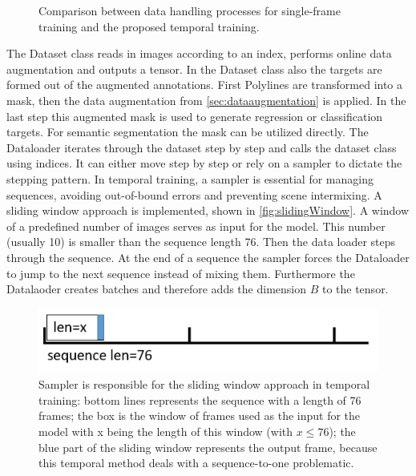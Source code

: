 \begin{figure}[H]
    \caption{Comparison between data handling processes for single-frame training and the proposed temporal training.}
    \label{fig:dataHandlingProcess}
\end{figure}

The Dataset class reads in images according to an index, performs online data augmentation and outputs a tensor.
In the Dataset class also the targets are formed out of the augmented annotations.
First Polylines are transformed into a mask, then the data augmentation from \autoref{sec:dataaugmentation} is applied.
In the last step this augmented mask is used to generate regression or classification targets.
For semantic segmentation the mask can be utilized directly.
The Dataloader iterates through the dataset step by step and calls the dataset class using indices.
It can either move step by step or rely on a sampler to dictate the stepping pattern.
In temporal training, a sampler is essential for managing sequences, avoiding out-of-bound errors and preventing scene intermixing.
A sliding window approach is implemented, shown in \autoref{fig:slidingWindow}.
A window of a predefined number of images serves as input for the model.
This number (usually 10) is smaller than the sequence length 76.
Then the data loader steps through the sequence.
At the end of a sequence the sampler forces the Dataloader to jump to the next sequence instead of mixing them.
Furthermore the Datalaoder creates batches and therefore adds the dimension $B$ to the tensor.

\begin{figure}[H]
    \centering
    \includegraphics[width=0.5\linewidth]{PICs/usedDatasets/slidingWindow.jpg}
    \caption{Sampler is responsible for the sliding window approach in temporal training: bottom lines represents the sequence with a length of 76 frames; the box is the window of frames used as the input for the model with x being the length of this window (with $x \leq 76$); the blue part of the sliding window represents the output frame, because this temporal method deals with a sequence-to-one problematic.}
    \label{fig:slidingWindow}
\end{figure}

